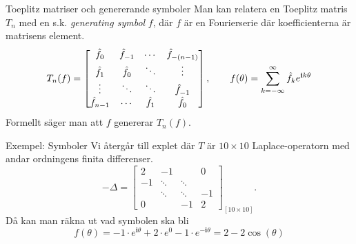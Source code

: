 \documentclass{beamer}
\begin{document}
\begin{frame}{Toeplitz matriser och genererande symboler}
    Man kan relatera en Toeplitz matris $T_n$ med en s.k. \textit{generating symbol} $f$, där $f$ är en Fourierserie där koefficienterna är matrisens element.
\begin{equation}
    T_n(f) = \begin{bmatrix}
    \hat{\mathnormal{f}}_0&\hat{\mathnormal{f}}_{-1}& \cdots &\hat{\mathnormal{f}}_{-(n-1)} \\
     \hat{\mathnormal{f}}_{1}&  \hat{\mathnormal{f}}_0& \ddots &\vdots\\
    \vdots& \ddots& \ddots& \hat{\mathnormal{f}}_{-1} \\
     \hat{\mathnormal{f}}_{n-1}&\cdots& \hat{\mathnormal{f}}_{1}& \hat{\mathnormal{f}}_0
\end{bmatrix}, \quad\quad f(\theta) = \sum^\infty_{k = -\infty} \hat{\mathnormal{f}}_k e^{\mathbf{i}k\theta}
\end{equation}
Formellt säger man att $f$ genererar $T_n(f)$.
\end{frame}


\begin{frame}{Exempel: Symboler}
    Vi återgår till explet där $T$ är $10\times10$ Laplace-operatorn med andar ordningens finita differenser.
    \begin{equation}
        -\Delta = \begin{bmatrix}
        2 & -1 &  &  0\\
        -1 & \ddots & \ddots &  \\
         & \ddots & \ddots & -1 \\
         0& & -1 & 2
    \end{bmatrix}_{[10\times10]}.
    \end{equation}
    Då kan man räkna ut vad symbolen ska bli 
    \begin{equation}
        f(\theta) = -1 \cdot e^{\mathbf{i}\theta} + 2\cdot e^{0} -1 \cdot e^{-\mathbf{i}\theta} = 2 - 2\cos(\theta)
    \end{equation}
\end{frame}
\end{document}
